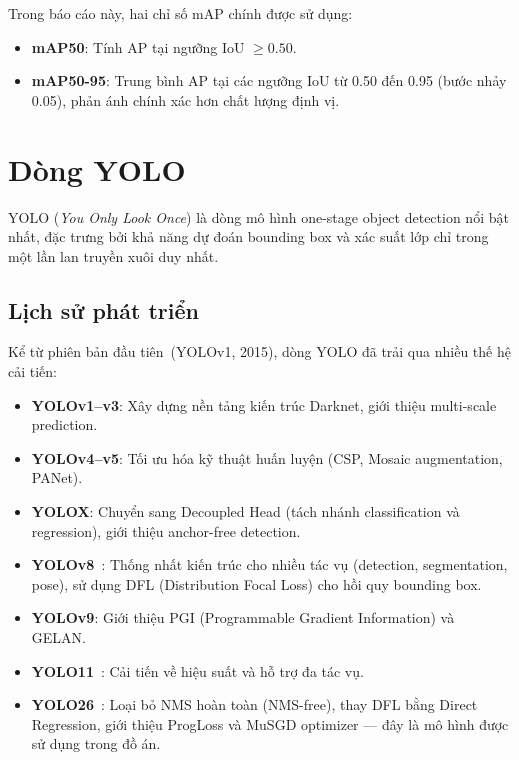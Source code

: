 Trong báo cáo này, hai chỉ số mAP chính được sử dụng:
\begin{itemize}
    \item \textbf{mAP50}: Tính AP tại ngưỡng IoU $\geq 0.50$.
    \item \textbf{mAP50-95}: Trung bình AP tại các ngưỡng IoU từ 0.50 đến 0.95 (bước nhảy 0.05), phản ánh chính xác hơn chất lượng định vị.
\end{itemize}

\section{Dòng YOLO}
\label{sec:bg_yolo}

YOLO (\textit{You Only Look Once}) là dòng mô hình one-stage object detection nổi bật nhất, đặc trưng bởi khả năng dự đoán bounding box và xác suất lớp chỉ trong một lần lan truyền xuôi duy nhất.

\subsection{Lịch sử phát triển}

Kể từ phiên bản đầu tiên~(YOLOv1, 2015), dòng YOLO đã trải qua nhiều thế hệ cải tiến:

\begin{itemize}
    \item \textbf{YOLOv1--v3}: Xây dựng nền tảng kiến trúc Darknet, giới thiệu multi-scale prediction.
    \item \textbf{YOLOv4--v5}: Tối ưu hóa kỹ thuật huấn luyện (CSP, Mosaic augmentation, PANet).
    \item \textbf{YOLOX}: Chuyển sang Decoupled Head (tách nhánh classification và regression), giới thiệu anchor-free detection.
    \item \textbf{YOLOv8}~\cite{ultralytics}: Thống nhất kiến trúc cho nhiều tác vụ (detection, segmentation, pose), sử dụng DFL (Distribution Focal Loss) cho hồi quy bounding box.
    \item \textbf{YOLOv9}: Giới thiệu PGI (Programmable Gradient Information) và GELAN.
    \item \textbf{YOLO11}~\cite{yolo11}: Cải tiến về hiệu suất và hỗ trợ đa tác vụ.
    \item \textbf{YOLO26}~\cite{yolo26}: Loại bỏ NMS hoàn toàn (NMS-free), thay DFL bằng Direct Regression, giới thiệu ProgLoss và MuSGD optimizer --- đây là mô hình được sử dụng trong đồ án.
\end{itemize}

